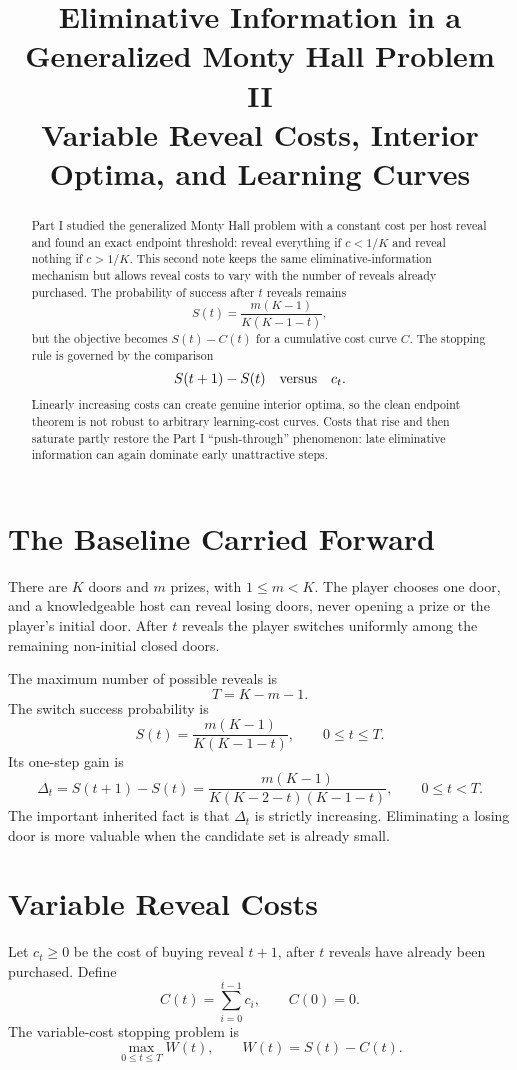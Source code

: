 \documentclass[11pt]{article}
\title{\textbf{Eliminative Information in a Generalized Monty Hall Problem II}\\
\large Variable Reveal Costs, Interior Optima, and Learning Curves}
\author{}
\date{}
\newcommand{\Tmax}{T}
\begin{document}
\maketitle

\begin{abstract}
Part I studied the generalized Monty Hall problem with a constant cost per
host reveal and found an exact endpoint threshold: reveal everything if
$c<1/K$ and reveal nothing if $c>1/K$.  This second note keeps the same
eliminative-information mechanism but allows reveal costs to vary with the
number of reveals already purchased.  The probability of success after $t$
reveals remains
\[
  S(t)=\frac{m(K-1)}{K(K-1-t)},
\]
but the objective becomes $S(t)-C(t)$ for a cumulative cost curve $C$.
The stopping rule is governed by the comparison
\[
  S(t+1)-S(t) \quad \hbox{versus} \quad c_t.
\]
Linearly increasing costs can create genuine interior optima, so the clean
endpoint theorem is not robust to arbitrary learning-cost curves.  Costs that
rise and then saturate partly restore the Part I ``push-through'' phenomenon:
late eliminative information can again dominate early unattractive steps.
\end{abstract}

\section{The Baseline Carried Forward}

There are $K$ doors and $m$ prizes, with $1\le m<K$.  The player chooses one
door, and a knowledgeable host can reveal losing doors, never opening a prize
or the player's initial door.  After $t$ reveals the player switches uniformly
among the remaining non-initial closed doors.

The maximum number of possible reveals is
\[
  \Tmax=K-m-1.
\]
The switch success probability is
\[
  S(t)=\frac{m(K-1)}{K(K-1-t)},\qquad 0\le t\le \Tmax.
\]
Its one-step gain is
\[
  \Delta_t=S(t+1)-S(t)
  =
  \frac{m(K-1)}{K(K-2-t)(K-1-t)},
  \qquad 0\le t<\Tmax.
\]
The important inherited fact is that $\Delta_t$ is strictly increasing.
Eliminating a losing door is more valuable when the candidate set is already
small.

\section{Variable Reveal Costs}

Let $c_t\ge0$ be the cost of buying reveal $t+1$, after $t$ reveals have
already been purchased.  Define
\[
  C(t)=\sum_{i=0}^{t-1} c_i,\qquad C(0)=0.
\]
The variable-cost stopping problem is
\[
  \max_{0\le t\le \Tmax} W(t),
  \qquad
  W(t)=S(t)-C(t).
\]
\end{document}
